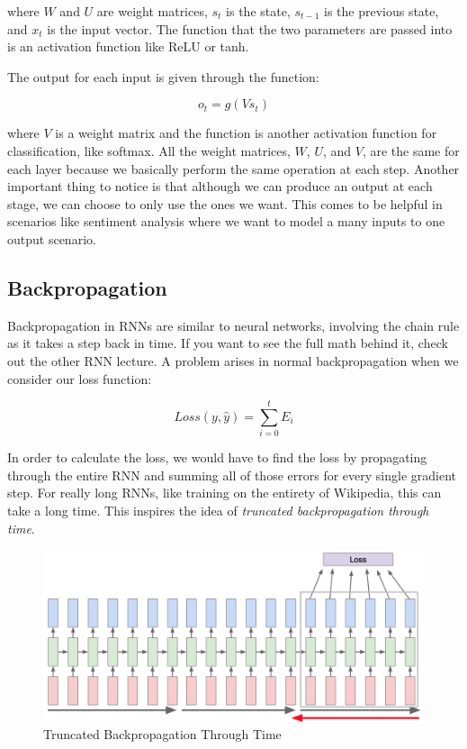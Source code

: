 \documentclass{article}
\begin{document}
where $W$ and $U$ are weight matrices, $s_{t}$ is the state, $s_{t-1}$ is the previous state, and $x_{t}$ is the input vector. The function that the two parameters are passed into is an activation function like ReLU or tanh.

The output for each input is given through the function:

\begin{equation}
    o_{t} = g(Vs_{t})
\end{equation}

where $V$ is a weight matrix and the function is another activation function for classification, like softmax. All the weight matrices, $W$, $U$, and $V$, are the same for each layer because we basically perform the same operation at each step. Another important thing to notice is that although we can produce an output at each stage, we can choose to only use the ones we want. This comes to be helpful in scenarios like sentiment analysis where we want to model a many inputs to one output scenario.

\subsection{Backpropagation}
Backpropagation in RNNs are similar to neural networks, involving the chain rule as it takes a step back in time. If you want to see the full math behind it, check out the other RNN lecture. A problem arises in normal backpropagation when we consider our loss function:

\begin{equation}
    Loss(y,\hat{y}) = \sum_{i=0}^{t}{E_{i}}
\end{equation}

In order to calculate the loss, we would have to find the loss by propagating through the entire RNN and summing all of those errors for every single gradient step. For really long RNNs, like training on the entirety of Wikipedia, this can take a long time. This inspires the idea of \textit{truncated backpropagation through time}.

\begin{figure}[H]
\centering
\includegraphics[scale=0.25]{truncated_backprop.png}
\caption{Truncated Backpropagation Through Time}
\label{fig:truncated_backprop}
\end{figure}
\end{document}
